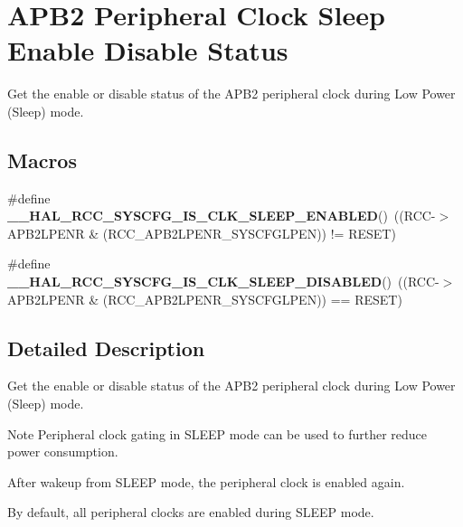 \hypertarget{group___r_c_c___a_p_b2___clock___sleep___enable___disable___status}{}\section{A\+P\+B2 Peripheral Clock Sleep Enable Disable Status}
\label{group___r_c_c___a_p_b2___clock___sleep___enable___disable___status}


Get the enable or disable status of the A\+P\+B2 peripheral clock during Low Power (Sleep) mode.  


\subsection*{Macros}
\begin{DoxyCompactItemize}
\item 
\mbox{\label{group___r_c_c___a_p_b2___clock___sleep___enable___disable___status_ga0e518b9a088d789d700d121db458403a}} 
\#define {\bfseries \+\_\+\+\_\+\+H\+A\+L\+\_\+\+R\+C\+C\+\_\+\+S\+Y\+S\+C\+F\+G\+\_\+\+I\+S\+\_\+\+C\+L\+K\+\_\+\+S\+L\+E\+E\+P\+\_\+\+E\+N\+A\+B\+L\+ED}()~((R\+CC-\/$>$A\+P\+B2\+L\+P\+E\+NR \& (R\+C\+C\+\_\+\+A\+P\+B2\+L\+P\+E\+N\+R\+\_\+\+S\+Y\+S\+C\+F\+G\+L\+P\+EN)) != R\+E\+S\+ET)
\item 
\mbox{\label{group___r_c_c___a_p_b2___clock___sleep___enable___disable___status_ga564fe78887dba5a7da7da1b9f2ffb372}} 
\#define {\bfseries \+\_\+\+\_\+\+H\+A\+L\+\_\+\+R\+C\+C\+\_\+\+S\+Y\+S\+C\+F\+G\+\_\+\+I\+S\+\_\+\+C\+L\+K\+\_\+\+S\+L\+E\+E\+P\+\_\+\+D\+I\+S\+A\+B\+L\+ED}()~((R\+CC-\/$>$A\+P\+B2\+L\+P\+E\+NR \& (R\+C\+C\+\_\+\+A\+P\+B2\+L\+P\+E\+N\+R\+\_\+\+S\+Y\+S\+C\+F\+G\+L\+P\+EN)) == R\+E\+S\+ET)
\end{DoxyCompactItemize}


\subsection{Detailed Description}
Get the enable or disable status of the A\+P\+B2 peripheral clock during Low Power (Sleep) mode. 

\begin{DoxyNote}{Note}
Peripheral clock gating in S\+L\+E\+EP mode can be used to further reduce power consumption. 

After wakeup from S\+L\+E\+EP mode, the peripheral clock is enabled again. 

By default, all peripheral clocks are enabled during S\+L\+E\+EP mode. 
\end{DoxyNote}
